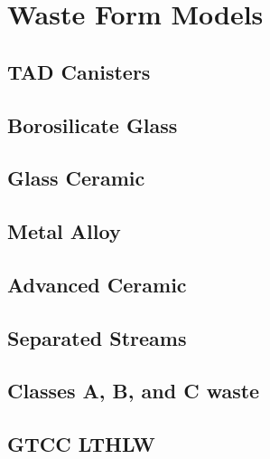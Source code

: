 \section{Waste Form Models}
\subsection{TAD Canisters}
\subsection{Borosilicate Glass}
\subsection{Glass Ceramic}
\subsection{Metal Alloy}
\subsection{Advanced Ceramic}
\subsection{Separated Streams}
\subsection{Classes A, B, and C waste}
\subsection{GTCC LTHLW}




